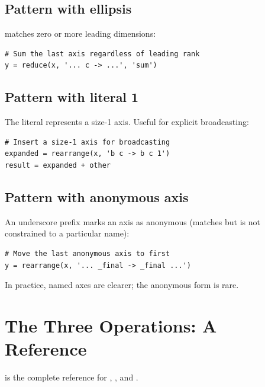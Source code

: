 \subsection{Pattern with ellipsis}
\label{ssec:einops:ellipsis_pattern}

 matches zero or more leading dimensions:

\begin{lstlisting}[style=lucid,language=LucidPython]
# Sum the last axis regardless of leading rank
y = reduce(x, '... c -> ...', 'sum')
\end{lstlisting}

\subsection{Pattern with literal 1}
\label{ssec:einops:literal_one}

The literal  represents a size-1 axis. Useful for
explicit broadcasting:

\begin{lstlisting}[style=lucid,language=LucidPython]
# Insert a size-1 axis for broadcasting
expanded = rearrange(x, 'b c -> b c 1')
result = expanded + other
\end{lstlisting}

\subsection{Pattern with anonymous axis}
\label{ssec:einops:anon_axis}

An underscore prefix marks an axis as anonymous (matches but is
not constrained to a particular name):

\begin{lstlisting}[style=lucid,language=LucidPython]
# Move the last anonymous axis to first
y = rearrange(x, '... _final -> _final ...')
\end{lstlisting}

In practice, named axes are clearer; the anonymous form is
rare.

\section{The Three Operations: A Reference}
\label{sec:einops:reference}

 is the complete reference for
, , and .

